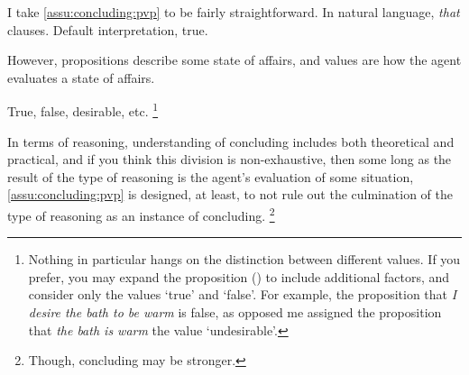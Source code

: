 \begin{note}
  I take \autoref{assu:concluding:pvp} to be fairly straightforward.
  In natural language, \emph{that} clauses.
  Default interpretation, true.

  However, propositions describe some state of affairs, and values are how the agent evaluates a state of affairs.

  True, false, desirable, etc.%
  \footnote{
    Nothing in particular hangs on the distinction between different values.
    If you prefer, you may expand the proposition (\world{}) to include additional factors, and consider only the values `true' and `false'.
    For example, the proposition that \emph{I desire the bath to be warm} is false, as opposed me assigned the proposition that \emph{the bath is warm} the value `undesirable'.
  }

  In terms of reasoning, understanding of concluding includes both theoretical and practical, and if you think this division is non-exhaustive, then some long as the result of the type of reasoning is the agent's evaluation of some situation, \autoref{assu:concluding:pvp} is designed, at least, to not rule out the culmination of the type of reasoning as an instance of concluding.%
  \footnote{
    Though, concluding may be stronger.
  }
\end{note}

